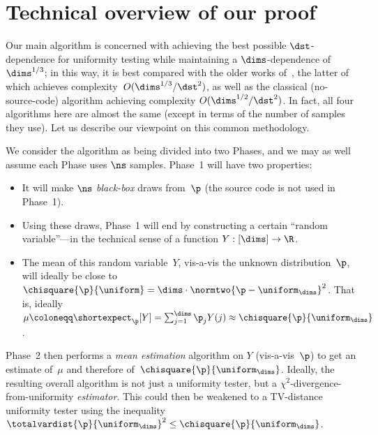 \documentclass[11pt]{article}
\newcommand{\E}{\shortexpect}
\begin{document}
\section{Technical overview of our proof}\label{sec:ideas}
Our main algorithm is concerned with achieving the best possible $\dst$-dependence for uniformity testing while maintaining a $\dims$-dependence of~$\dims^{1/3}$; in this way, it is best compared with the older works of~\cite{BHH11,CFMdW10}, the latter of which achieves complexity~$O(\dims^{1/3}/\dst^2)$, as well as the classical (no-source-code) algorithm achieving complexity $O(\dims^{1/2}/\dst^2)$.
In fact, all four algorithms here are almost the same (except in terms of the number of samples they use).
Let us describe our viewpoint on this common methodology. 

\noindent We consider the algorithm as being divided into two Phases, and we may as well assume each Phase uses $\ns$ samples.
Phase~1 will have two properties:
\begin{itemize}
 \item It will make $\ns$ \emph{black-box} draws from~$\p$ (\ie the source code is not used in Phase~1).

 \item Using these draws, Phase~1 will end by constructing a certain ``random variable''---in the technical sense of a function $Y : [\dims] \to \R$.

  \item The mean of this random variable~$Y$, vis-a-vis the unknown distribution~$\p$, will ideally be close to $\chisquare{\p}{\uniform} = \dims \cdot \normtwo{\p - \uniform_\dims}^2$. 
  That is, ideally $\mu \coloneqq \E_{\p}[Y] = \sum_{j=1}^\dims \p_j Y(j) \approx \chisquare{\p}{\uniform_\dims}$.
\end{itemize}
\noindent Phase~2 then performs a \emph{mean estimation} algorithm on $Y$ (vis-a-vis~$\p$) to get an estimate of~$\mu$ and therefore of~$\chisquare{\p}{\uniform_\dims}$.  
Ideally, the resulting overall algorithm is not just a uniformity tester, but a $\chi^2$-divergence-from-uniformity \emph{estimator}.  
This could then be weakened to a TV-distance uniformity tester using the inequality $\totalvardist{\p}{\uniform_\dims}^2 \leq \chisquare{\p}{\uniform_\dims}$.
\end{document}
